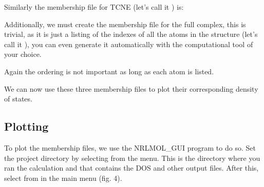 \documentclass[letterpaper,10pt,english,openany,oneside]{sphinxmanual}
\begin{document}
\sphinxAtStartPar
Similarly the membership file for TCNE (let’s call it ) is:

\begin{sphinxVerbatim}[commandchars=\\\{\}]
\end{sphinxVerbatim}

\sphinxAtStartPar
Additionally, we must create the membership file for the full complex, this is trivial, as it is just a listing of the indexes of all the atoms in the structure (let’s call it ), you can even generate it automatically with the computational tool of your choice.

\begin{sphinxVerbatim}[commandchars=\\\{\}]
\end{sphinxVerbatim}

\sphinxAtStartPar
Again the ordering is not important as long as each atom is listed.

\sphinxAtStartPar
We can now use these three membership files to plot their corresponding density of states.


\subsection{Plotting}
\label{\detokenize{tutorials/ddos/density_of_states:plotting}}
\sphinxAtStartPar
To plot the membership files, we use the NRLMOL\_GUI program to do so. Set the project directory by selecting  from the  menu. This is the directory where you ran the calculation and that contains the DOS and other output files.  After this, select  from  in the main menu (fig. 4).

\begin{figure}[htbp]
\centering

\noindent{}
\end{figure}
\end{document}
